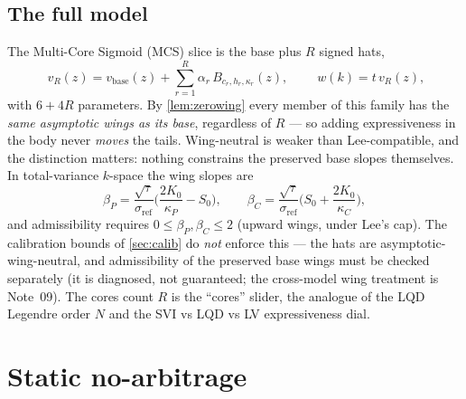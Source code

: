 \documentclass[11pt]{article}
\begin{document}
\subsection{The full model}

The Multi-Core Sigmoid (MCS) slice is the base plus $R$ signed hats,
\begin{equation}
\boxed{\;v_R(z)=v_{\text{base}}(z)+\sum_{r=1}^{R}\alpha_r\,B_{c_r,h_r,\kappa_r}(z),\;}
\qquad w(k)=t\,v_R(z),
\label{eq:model}
\end{equation}
with $6+4R$ parameters. By \cref{lem:zerowing} every member of this family has
the \emph{same asymptotic wings as its base}, regardless of $R$ --- so adding
expressiveness in the body never \emph{moves} the tails. Wing-neutral is
weaker than Lee-compatible, and the distinction matters: nothing constrains
the preserved base slopes themselves. In total-variance $k$-space the wing
slopes are
\begin{equation}
\beta_P=\frac{\sqrt{\tau}}{\sigma_{\text{ref}}}\Big(\frac{2K_0}{\kappa_P}-S_0\Big),
\qquad
\beta_C=\frac{\sqrt{\tau}}{\sigma_{\text{ref}}}\Big(S_0+\frac{2K_0}{\kappa_C}\Big),
\label{eq:beta_kspace}
\end{equation}
and admissibility requires $0\le\beta_{P},\beta_{C}\le2$ (upward wings, under
Lee's cap). The calibration bounds of \cref{sec:calib} do \emph{not} enforce
this --- the hats are asymptotic-wing-neutral, and admissibility of the
preserved base wings must be checked separately (it is diagnosed, not
guaranteed; the cross-model wing treatment is Note~09). The cores count $R$
is the ``cores'' slider, the analogue of the LQD Legendre order $N$ and the
SVI vs LQD vs LV expressiveness dial.

\section{Static no-arbitrage}
\label{sec:noarb}
\end{document}
